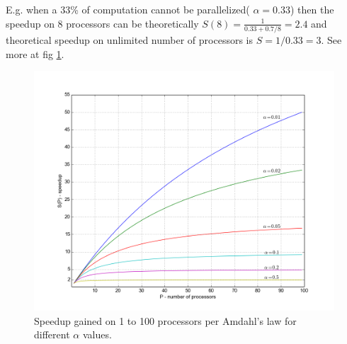 E.g. when a 33\% of computation cannot be parallelized( $\alpha = 0.33$) then the speedup on 8 processors can be theoretically $S(8) = \frac{1}{0.33+0.7/8} = 2.4$ and theoretical speedup on unlimited number of processors is $S = 1/0.33=3$. See more at fig \ref{fig:amdahl}.
\begin{figure}[ht]
    \centering
    \includegraphics[width=1\textwidth]{chapter2/Amdahl.png}
    \caption{Speedup gained on 1 to 100 processors per Amdahl's law for different $\alpha$ values.}
    \label{fig:amdahl}
\end{figure}

